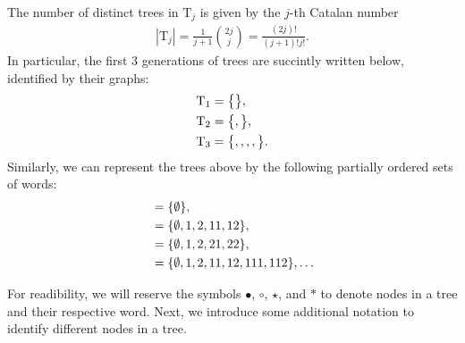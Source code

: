 \documentclass[%
11pt,  reqno]{amsart}
\makeatletter
\newcommand{\5}{\textup{V}}
\newcommand{\noi}{\noindent}
\theoremstyle{remark}
\newcommand{\bul}{\bullet}
\newcommand{\TT}{\mathcal{T}}
\newcommand{\Tr}{\mathrm{T}}
\def\<#1>{\csname MH@symb@#1\endcsname}
\numberwithin{equation}{section}
\numberwithin{theorem}{section}
\makeatother
\begin{document}
\noi
The number of distinct trees in $\Tr_j$ is given by the $j$-th Catalan number
\begin{align}\label{eq:catalan}
| \Tr_j | = \frac{1}{j+1} \binom{2j}{j}  = \frac{(2j)!}{(j+1)! j !}.
\end{align}
In particular, the first 3 generations of trees are succintly written below, identified by their graphs:
\begin{align*}
\Tr_1 & = \big\{ \<1> \big\}, \\
\Tr_2 & = \big\{ \<21>, \<22> \big\}, \\
\Tr_3 &  = \big\{ \<31>, \<32>, \<33>, \<34>, \<35> \big\}.
\end{align*}
Similarly, we can represent the trees above by the following partially ordered sets of words:
\begin{align}
\<1> 
&
= \{\emptyset\}
, 
\\
\<21>
&
=
\{ \emptyset, 1 ,2, 11,12  \}
, 
\\
\<22>
&
=
\{\emptyset, 1,2, 21,22\}
, 
\\
\<31>
&
= 
\{
\emptyset, 1,2, 11,12, 111, 112
\}
, \ldots
\end{align}




\smallskip








For readibility, we will reserve the symbols $\bul$, $\circ$, $\star$, and $\ast$ to denote nodes in a tree and their respective word. 
Next, we introduce some additional notation to identify different nodes in a tree. 
\end{document}
